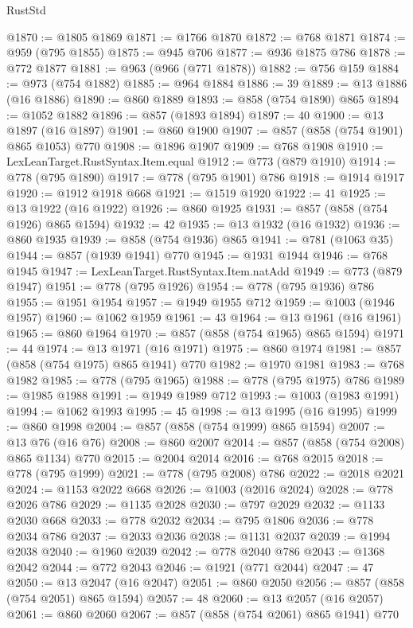 \begin{lexlean}{RustStd}
\begin{coremodule}
@1870 := @1805 @1869
@1871 := @1766 @1870
@1872 := @768 @1871
@1874 := @959 (@795 @1855)
@1875 := @945 @706
@1877 := @936 @1875 @786
@1878 := @772 @1877
@1881 := @963 (@966 (@771 @1878))
@1882 := @756 @159
@1884 := @973 (@754 @1882)
@1885 := @964 @1884
@1886 := 39
@1889 := @13 @1886 (@16 @1886)
@1890 := @860 @1889
@1893 := @858 (@754 @1890) @865
@1894 := @1052 @1882
@1896 := @857 (@1893 @1894)
@1897 := 40
@1900 := @13 @1897 (@16 @1897)
@1901 := @860 @1900
@1907 := @857 (@858 (@754 @1901) @865 @1053) @770
@1908 := @1896 @1907
@1909 := @768 @1908
@1910 := LexLeanTarget.RustSyntax.Item.equal
@1912 := @773 (@879 @1910)
@1914 := @778 (@795 @1890)
@1917 := @778 (@795 @1901) @786
@1918 := @1914 @1917
@1920 := @1912 @1918 @668
@1921 := @1519 @1920
@1922 := 41
@1925 := @13 @1922 (@16 @1922)
@1926 := @860 @1925
@1931 := @857 (@858 (@754 @1926) @865 @1594)
@1932 := 42
@1935 := @13 @1932 (@16 @1932)
@1936 := @860 @1935
@1939 := @858 (@754 @1936) @865
@1941 := @781 (@1063 @35)
@1944 := @857 (@1939 @1941) @770
@1945 := @1931 @1944
@1946 := @768 @1945
@1947 := LexLeanTarget.RustSyntax.Item.natAdd
@1949 := @773 (@879 @1947)
@1951 := @778 (@795 @1926)
@1954 := @778 (@795 @1936) @786
@1955 := @1951 @1954
@1957 := @1949 @1955 @712
@1959 := @1003 (@1946 @1957)
@1960 := @1062 @1959
@1961 := 43
@1964 := @13 @1961 (@16 @1961)
@1965 := @860 @1964
@1970 := @857 (@858 (@754 @1965) @865 @1594)
@1971 := 44
@1974 := @13 @1971 (@16 @1971)
@1975 := @860 @1974
@1981 := @857 (@858 (@754 @1975) @865 @1941) @770
@1982 := @1970 @1981
@1983 := @768 @1982
@1985 := @778 (@795 @1965)
@1988 := @778 (@795 @1975) @786
@1989 := @1985 @1988
@1991 := @1949 @1989 @712
@1993 := @1003 (@1983 @1991)
@1994 := @1062 @1993
@1995 := 45
@1998 := @13 @1995 (@16 @1995)
@1999 := @860 @1998
@2004 := @857 (@858 (@754 @1999) @865 @1594)
@2007 := @13 @76 (@16 @76)
@2008 := @860 @2007
@2014 := @857 (@858 (@754 @2008) @865 @1134) @770
@2015 := @2004 @2014
@2016 := @768 @2015
@2018 := @778 (@795 @1999)
@2021 := @778 (@795 @2008) @786
@2022 := @2018 @2021
@2024 := @1153 @2022 @668
@2026 := @1003 (@2016 @2024)
@2028 := @778 @2026 @786
@2029 := @1135 @2028
@2030 := @797 @2029
@2032 := @1133 @2030 @668
@2033 := @778 @2032
@2034 := @795 @1806
@2036 := @778 @2034 @786
@2037 := @2033 @2036
@2038 := @1131 @2037
@2039 := @1994 @2038
@2040 := @1960 @2039
@2042 := @778 @2040 @786
@2043 := @1368 @2042
@2044 := @772 @2043
@2046 := @1921 (@771 @2044)
@2047 := 47
@2050 := @13 @2047 (@16 @2047)
@2051 := @860 @2050
@2056 := @857 (@858 (@754 @2051) @865 @1594)
@2057 := 48
@2060 := @13 @2057 (@16 @2057)
@2061 := @860 @2060
@2067 := @857 (@858 (@754 @2061) @865 @1941) @770

\end{coremodule}
\end{lexlean}
